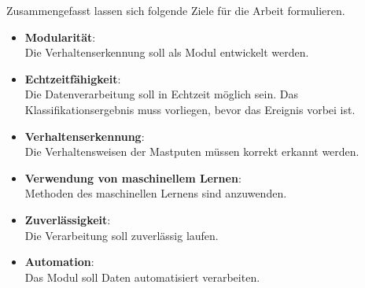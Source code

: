 Zusammengefasst lassen sich folgende Ziele für die Arbeit formulieren.

\begin{itemize}
    \item \textbf{Modularität}: \\
    Die Verhaltenserkennung soll als Modul entwickelt werden.
    \item \textbf{Echtzeitfähigkeit}: \\
    Die Datenverarbeitung soll in Echtzeit möglich sein. Das Klassifikationsergebnis muss vorliegen, bevor das Ereignis vorbei ist.
    \item \textbf{Verhaltenserkennung}: \\
    Die Verhaltensweisen der Mastputen müssen korrekt erkannt werden.
    \item \textbf{Verwendung von maschinellem Lernen}: \\
    Methoden des maschinellen Lernens sind anzuwenden.
    \item \textbf{Zuverlässigkeit}: \\
    Die Verarbeitung soll zuverlässig laufen.
    \item \textbf{Automation}: \\
    Das Modul soll Daten automatisiert verarbeiten. 
\end{itemize}
